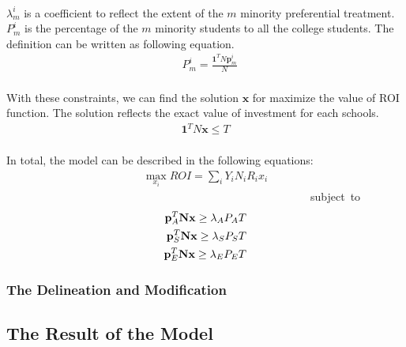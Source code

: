 \documentclass{mcmthesis}
\begin{document}
\paragraph{} $\lambda_{m}^i$ is a coefficient to reflect the extent of the $m$ minority preferential treatment. $P_{m}^i$ is the percentage of the $m$ minority students to all the college students. The definition can be written as following equation.
\begin{align}
&P_m^i =\frac{\mathbf{1}^T N \mathbf{p}_m^i}{N}
\end{align}

\paragraph{} With these constraints, we can find the solution $\mathbf{x}$ for maximize the value of ROI function. The solution reflects the exact value of investment for each schools. 
\begin{align}
\mathbf{1}^T N \mathbf{x} \leq T
\end{align}

\paragraph{} In total, the model can be described in the following equations:
\begin{align}
\max_{x_i} ROI=\sum_i Y_i N_i R_i x_i
\end{align}
\ \ \ \ \ \ \ \ \ \ \ \ \ \ \ \ \ \ \ \ \ \ \ \ \ \ \ \ \ \ \ \ \ \ \ \ \ \ \ \ \ \ \ \ \ \ \ \ \ \ \ \ \ \ \ subject\ to\\
\begin{align}
\mathbf{p}_A^T\*\mathbf{N}\*\mathbf{x}\geq\lambda_A\*P_A\*T\\
\mathbf{p}_S^T\*\mathbf{N}\*\mathbf{x}\geq\lambda_S\*P_S\*T\\
\mathbf{p}_E^T\*\mathbf{N}\*\mathbf{x}\geq\lambda_E\*P_E\*T
\end{align}


\subsubsection{The Delineation and Modification}

%
\subsection{The Result of the Model}
\end{document}
